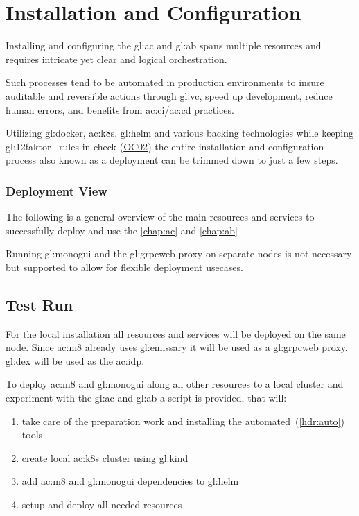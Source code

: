 %
\chapter{Installation and Configuration}

Installing and configuring the \gls{gl:ac} and \gls{gl:ab} spans multiple resources and requires intricate yet clear and logical orchestration.

Such processes tend to be automated in production environments to insure auditable and reversible actions through \gls{gl:vc}, speed up development, reduce human errors, and benefits from \gls{ac:ci}/\gls{ac:cd} practices.

Utilizing \gls{gl:docker}, \gls{ac:k8s}, \gls{gl:helm} and various backing technologies while keeping \gls{gl:12faktor}~\citep{TheTwelv47} rules in check (\hyperref[oc:ac02]{OC02}) the entire installation and configuration process also known as a deployment can be trimmed down to just a few steps.

\subsection{Deployment View}

The following is a general overview of the main resources and services to successfully deploy and use the \ref{chap:ac} and \ref{chap:ab} 


Running \gls{gl:monogui} and the \gls{gl:grpcweb} proxy on separate nodes is not necessary but supported to allow for flexible deployment usecases.

\section{Test Run}

For the local installation all resources and services will be deployed on the same node. Since \gls{ac:m8} already uses \gls{gl:emissary} it will be used as a \gls{gl:grpcweb} proxy. \Gls{gl:dex} will be used as the \gls{ac:idp}.

To deploy \gls{ac:m8} and \gls{gl:monogui} along all other resources to a local cluster and experiment with the \gls{gl:ac} and \gls{gl:ab} a script is provided, that will:

\begin{enumerate}
  \item take care of the preparation work and installing the automated~(\ref{hdr:auto}) tools
  \item create local \gls{ac:k8s} cluster using \gls{gl:kind}
  \item add \gls{ac:m8} and \gls{gl:monogui} dependencies to \gls{gl:helm}
  \item setup and deploy all needed resources
\end{enumerate}

